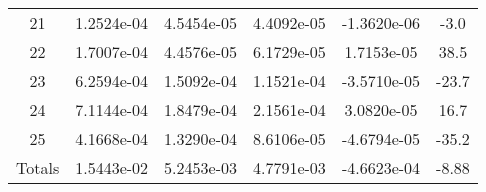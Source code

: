 \begin{table}[h]
\begin{center}
\begin{tabular}[h]{|c|c|c|c|c|c|}
21  &1.2524e-04 & 4.5454e-05 & 4.4092e-05 & -1.3620e-06 &  -3.0 \\
22  &1.7007e-04 & 4.4576e-05 & 6.1729e-05 & 1.7153e-05 &  38.5 \\ 
23  &6.2594e-04 & 1.5092e-04 & 1.1521e-04 & -3.5710e-05 &  -23.7 \\
24  &7.1144e-04 & 1.8479e-04 & 2.1561e-04 & 3.0820e-05 &  16.7 \\ 
25  &4.1668e-04 & 1.3290e-04 & 8.6106e-05 & -4.6794e-05 &  -35.2 \\
\hline \hline
Totals & 1.5443e-02 & 5.2453e-03 & 4.7791e-03 & -4.6623e-04   & -8.88 \\
\hline
\end{tabular}
\label{tab:loo_crud_bmass}
\end{center}
\end{table}


